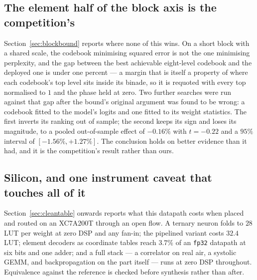 \documentclass[11pt]{article}
\theoremstyle{definition}
\begin{document}
\subsection*{The element half of the block axis is the competition's}

Section~\ref{sec:blockbound} reports where none of this wins. On a short block
with a shared scale, the codebook minimising squared error is not the one
minimising perplexity, and the gap between the best achievable eight-level
codebook and the deployed one is under one percent --- a margin that is itself
a property of where each codebook's top level sits inside its binade, so it is
requoted with every top normalised to $1$ and the phase held at zero. Two
further searches were run against that gap after the bound's original argument
was found to be wrong: a codebook fitted to the model's logits and one fitted
to its weight statistics. The first inverts its ranking out of sample; the
second keeps its sign and loses its magnitude, to a pooled out-of-sample effect
of $-0.16\%$ with $t = -0.22$ and a $95\%$ interval of $[-1.56\%, +1.27\%]$.
The conclusion holds on better evidence than it had, and it is the
competition's result rather than ours.

\subsection*{Silicon, and one instrument caveat that touches all of it}

Section~\ref{sec:cleantable} onwards reports what this datapath costs when
placed and routed on an XC7A200T through an open flow. A ternary neuron folds to $28$
LUT per weight at zero DSP and any fan-in; the pipelined variant costs $32.4$
LUT; element decoders as coordinate tables reach $3.7\%$ of an \texttt{fp32}
datapath at six bits and one adder; and a full stack --- a correlator on real
air, a systolic GEMM, and backpropagation on the part itself --- runs at zero
DSP throughout. Equivalence against the reference is checked before synthesis
rather than after.
\end{document}
